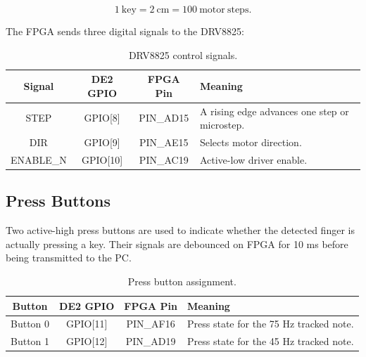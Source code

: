 \begin{equation}
    1~\mathrm{key} = 2~\mathrm{cm} = 100~\mathrm{motor~steps}.
\end{equation}

The FPGA sends three digital signals to the DRV8825:

\begin{table}[H]
    \centering
    \caption{DRV8825 control signals.}
    \label{tab:drv8825_gpio}
    \renewcommand{\arraystretch}{1.2}
    \begin{tabular}{c c c p{6.5cm}}
        \toprule
        \textbf{Signal} & \textbf{DE2 GPIO} & \textbf{FPGA Pin} & \textbf{Meaning} \\
        \midrule
        STEP & GPIO[8] & PIN\_AD15 & A rising edge advances one step or microstep. \\
        DIR & GPIO[9] & PIN\_AE15 & Selects motor direction. \\
        ENABLE\_N & GPIO[10] & PIN\_AC19 & Active-low driver enable. \\
        \bottomrule
    \end{tabular}
\end{table}

\subsection{Press Buttons}

Two active-high press buttons are used to indicate whether the detected finger is actually pressing a key. Their signals are debounced on FPGA for 10 ms before being transmitted to the PC.

\begin{table}[H]
    \centering
    \caption{Press button assignment.}
    \label{tab:button_gpio}
    \renewcommand{\arraystretch}{1.2}
    \begin{tabular}{c c c p{6.5cm}}
        \toprule
        \textbf{Button} & \textbf{DE2 GPIO} & \textbf{FPGA Pin} & \textbf{Meaning} \\
        \midrule
        Button 0 & GPIO[11] & PIN\_AF16 & Press state for the 75 Hz tracked note. \\
        Button 1 & GPIO[12] & PIN\_AD19 & Press state for the 45 Hz tracked note. \\
        \bottomrule
    \end{tabular}
\end{table}

